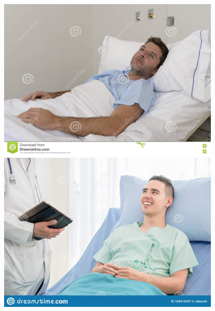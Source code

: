 \begin{frame}
\begin{figure}[!ht]
\begin{minipage}[t]{0.23\textwidth}
        \end{minipage}
        \hfill
        \begin{minipage}[t]{0.23\textwidth}
        \centering
          \includegraphics[width=0.95\textwidth]{images/output-neutral.jpg}
        \end{minipage}
        \hfill
        \begin{minipage}[t]{0.23\textwidth}
        \centering
          \includegraphics[width=0.95\textwidth]{images/output-happy.jpg}
        \end{minipage}
        \label{fig:output}
      \end{figure}
\end{frame}
    





